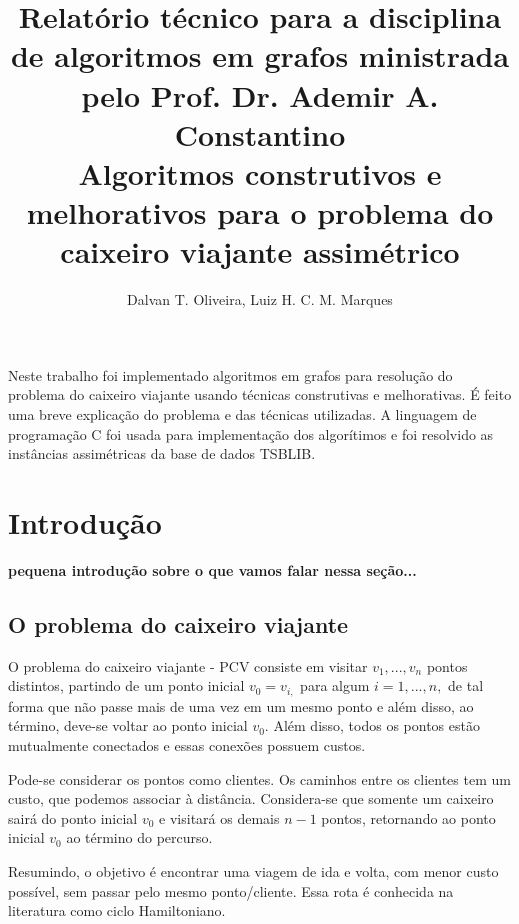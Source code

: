 \documentclass[12pt]{article}
\title{
Relatório técnico para a disciplina de algoritmos em grafos ministrada pelo Prof. Dr. Ademir A. Constantino\\
Algoritmos construtivos e melhorativos para o problema do caixeiro viajante assimétrico
}
\author{Dalvan T. Oliveira\inst{1},  Luiz H. C. M. Marques\inst{1} }
\begin{document}
 

\maketitle

     
\begin{resumo} 
	Neste trabalho foi implementado algoritmos em grafos para resolução do problema
	do caixeiro viajante usando técnicas construtivas e melhorativas.
	É feito uma breve explicação do problema e das técnicas utilizadas.
	A linguagem de programação C foi usada para implementação dos algorítimos e
	foi resolvido as instâncias assimétricas da base de dados TSBLIB.

\end{resumo}


\section{Introdução}
\textbf{pequena introdução sobre o que vamos falar nessa seção...}

\subsection{O problema do caixeiro viajante}
O problema do caixeiro viajante - PCV consiste em visitar
$ v_{1},...,v_{n} $
pontos distintos, partindo de um ponto inicial
$v_{0} = v_{i,}$
para algum
$i=1,...,n,$
de tal forma que não passe mais de uma vez em um mesmo ponto
e além disso, ao término, deve-se voltar ao ponto inicial
$v_{0}.$
Além disso, todos os pontos estão mutualmente conectados e essas
conexões possuem custos.

Pode-se considerar os pontos como clientes.
Os caminhos entre os clientes tem um custo,
que podemos associar à distância.
Considera-se que somente um caixeiro sairá do ponto inicial $v_{0}$
e visitará os demais $ n-1 $ pontos,
retornando ao ponto inicial $v_{0}$ ao término do percurso.

Resumindo, o objetivo é encontrar uma viagem de ida e volta,
com menor custo possível, sem passar pelo mesmo ponto/cliente.
Essa rota é conhecida na literatura como ciclo Hamiltoniano.
\end{document}

